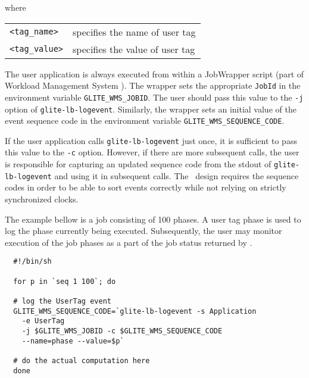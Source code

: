 where

\begin{tabularx}{\textwidth}{lX}
\texttt{<tag\_name>}  & specifies the name of user tag \\
\texttt{<tag\_value>} & specifies the value of user tag \\
\end{tabularx}

The user application is always executed from within a JobWrapper script (part
of Workload Management System \cite{jgc}). The wrapper  sets the  appropriate
\verb'JobId' in the environment variable \verb'GLITE_WMS_JOBID'. The user
should pass this value to the \verb'-j' option of \verb'glite-lb-logevent'.
Similarly, the wrapper sets an initial value of the event sequence code in the
environment variable \verb'GLITE_WMS_SEQUENCE_CODE'.

If the user application calls \verb'glite-lb-logevent' just once, it is
sufficient to pass this value to the \verb'-c' option.  However, if there are
more  subsequent calls,  the  user is responsible for capturing an updated
sequence code from the stdout of \verb'glite-lb-logevent' and using it in
subsequent calls. The \LB\ design requires the sequence codes in  order  to be
able to sort events correctly while not relying on strictly synchronized
clocks.

The example bellow is a job consisting of 100 phases. A user tag phase is used
to log the phase currently being executed. Subsequently, the user may monitor
execution of the job phases as a part of the job status returned by \LB.

\begin{verbatim}
  #!/bin/sh

  for p in `seq 1 100`; do

  # log the UserTag event
  GLITE_WMS_SEQUENCE_CODE=`glite-lb-logevent -s Application
    -e UserTag
    -j $GLITE_WMS_JOBID -c $GLITE_WMS_SEQUENCE_CODE
    --name=phase --value=$p`

  # do the actual computation here
  done
\end{verbatim}
